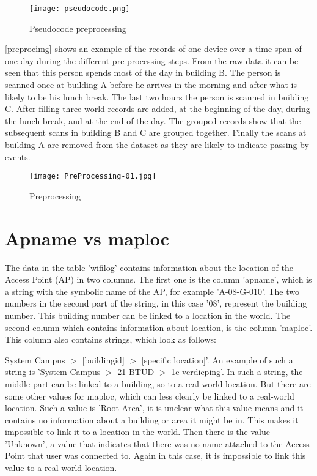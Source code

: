 \begin{figure}[H]
\centering
\texttt{[image: pseudocode.png]}
\captionsetup{justification=centering}
\caption{Pseudocode preprocessing}
\label{kaas}
\end{figure}

\autoref{preprocimg} shows an example of the records of one device over a time span of one day during the different pre-processing steps. From the raw data it can be seen that this person spends most of the day in building B. The person is scanned once at building A before he arrives in the morning and after what is likely to be his lunch break. The last two hours the person is scanned in building C. After filling three world records are added, at the beginning of the day, during the lunch break, and at the end of the day. The grouped records show that the subsequent scans in building B and C are grouped together. Finally the scans at building A are removed from the dataset as they are likely to indicate passing by events. 

\begin{figure}[H]
\centering
\texttt{[image: PreProcessing-01.jpg]}
\captionsetup{justification=centering}
\caption{Preprocessing}
\label{preprocimg}
\end{figure}


\section{Apname vs maploc}
The data in the table 'wifilog' contains information about the location of the Access Point (AP) in two columns. The first one is the column 'apname', which is a string with the symbolic name of the AP, for example 'A-08-G-010'. The two numbers in the second part of the string, in this case '08', represent the building number. This building number can be linked to a location in the world. 
The second column which contains information about location, is the column 'maploc'. This column also contains strings, which look as follows:

System Campus $>$ [buildingid] $>$ [specific location]'. An example of such a string is 'System Campus $>$ 21-BTUD $>$ 1e verdieping'. In such a string, the middle part can be linked to a building, so to a real-world location. 
But there are some other values for maploc, which can less clearly be linked to a real-world location. Such a value is 'Root Area', it is unclear what this value means and it contains no information about a building or area it might be in. This makes it impossible to link it to a location in the world. Then there is the value 'Unknown', a value that indicates that there was no name attached to the Access Point that user was connected to. Again in this case, it is impossible to link this value to a real-world location. 

